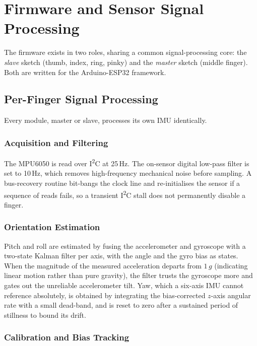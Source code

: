 \chapter{Firmware and Sensor Signal Processing}

The firmware exists in two roles, sharing a common signal-processing core: the
\emph{slave} sketch (thumb, index, ring, pinky) and the \emph{master} sketch
(middle finger). Both are written for the Arduino-ESP32 framework.

\section{Per-Finger Signal Processing}

Every module, master or slave, processes its own IMU identically.

\subsection{Acquisition and Filtering}

The MPU6050 is read over I\textsuperscript{2}C at 25\,Hz. The on-sensor digital
low-pass filter is set to 10\,Hz, which removes high-frequency mechanical noise
before sampling. A bus-recovery routine bit-bangs the clock line and
re-initialises the sensor if a sequence of reads fails, so a transient
I\textsuperscript{2}C stall does not permanently disable a finger.

\subsection{Orientation Estimation}

Pitch and roll are estimated by fusing the accelerometer and gyroscope with a
two-state Kalman filter \cite{kalman} per axis, with the angle and the gyro
bias as states. When the magnitude of the measured acceleration departs from
$1\,g$ (indicating linear motion rather than pure gravity), the filter trusts
the gyroscope more and gates out the unreliable accelerometer tilt. Yaw, which
a six-axis IMU cannot reference absolutely, is obtained by integrating the
bias-corrected $z$-axis angular rate with a small dead-band, and is reset to
zero after a sustained period of stillness to bound its drift.

\subsection{Calibration and Bias Tracking}

